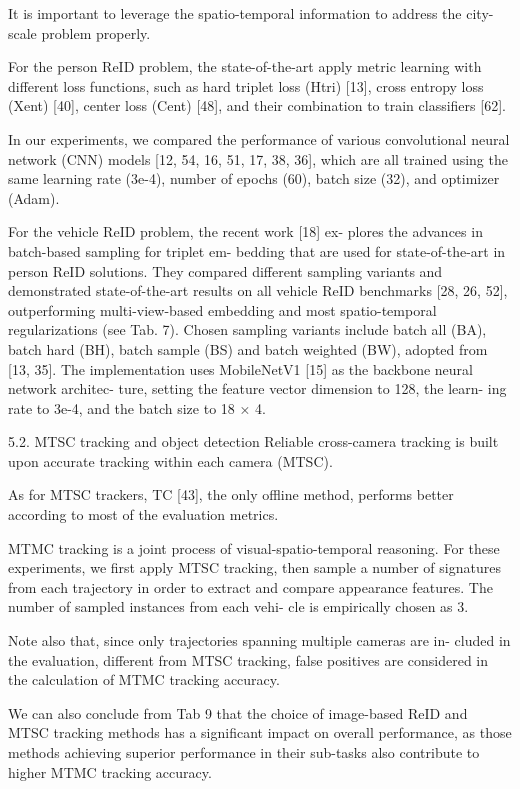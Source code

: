 It is important to leverage the spatio-temporal
information to address the city-scale problem properly.



For the person ReID problem, the state-of-the-art apply
metric learning with different loss functions, such as hard
triplet loss (Htri) [13], cross entropy loss (Xent) [40], center loss (Cent) [48], and their combination to train classifiers [62]. 

In our experiments, we compared the performance of various convolutional neural network (CNN) models [12, 54, 16, 51, 17, 38, 36], which are all trained
using the same learning rate (3e-4), number of epochs (60),
batch size (32), and optimizer (Adam). 

For the vehicle ReID problem, the recent work [18] ex-
plores the advances in batch-based sampling for triplet em-
bedding that are used for state-of-the-art in person ReID
solutions. They compared different sampling variants and
demonstrated state-of-the-art results on all vehicle ReID
benchmarks [28, 26, 52], outperforming multi-view-based
embedding and most spatio-temporal regularizations (see
Tab. 7). Chosen sampling variants include batch all (BA),
batch hard (BH), batch sample (BS) and batch weighted
(BW), adopted from [13, 35]. The implementation uses
MobileNetV1 [15] as the backbone neural network architec-
ture, setting the feature vector dimension to 128, the learn-
ing rate to 3e-4, and the batch size to 18 × 4.




5.2. MTSC tracking and object detection
Reliable cross-camera tracking is built upon accurate
tracking within each camera (MTSC). 

As for MTSC trackers, TC [43], the
only offline method, performs better according to most of the evaluation metrics. 


MTMC tracking is a joint process of visual-spatio-temporal reasoning. 
For these experiments, we first apply
MTSC tracking, then sample a number of signatures from
each trajectory in order to extract and compare appearance
 features. The number of sampled instances from each vehi-
cle is empirically chosen as 3. 

Note also that,
since only trajectories spanning multiple cameras are in-
cluded in the evaluation, different from MTSC tracking,
false positives are considered in the calculation of MTMC
tracking accuracy.


We can also conclude from Tab 9 that the
choice of image-based ReID and MTSC tracking methods
has a significant impact on overall performance, as those
methods achieving superior performance in their sub-tasks
also contribute to higher MTMC tracking accuracy.


